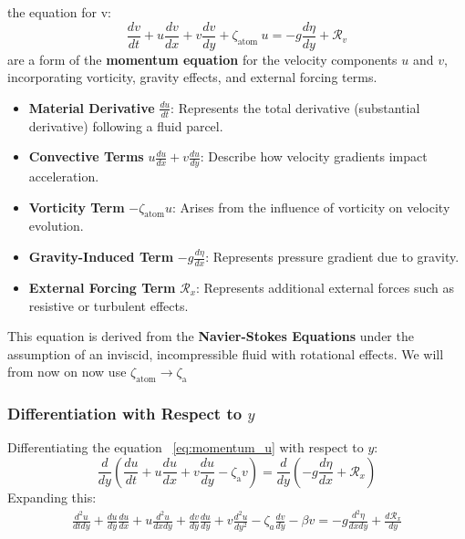 \documentclass[a4paper,12pt]{article}
\begin{document}
    the equation for v:
    \begin{equation}
        \frac{d v}{d t}+u \frac{d v}{d x}+v \frac{d v}{d y}+\zeta_{\text {atom }} u=-g \frac{d \eta}{d y}+\mathcal{R}_v\label{eq:momentum_v}
    \end{equation}
    are a form of the \textbf{momentum equation} for the velocity components $u$ and $v$, incorporating vorticity, gravity effects, and external
    forcing
    terms.

    \begin{itemize}
        \item \textbf{Material Derivative} $\frac{d u}{d t}$: Represents the total derivative (substantial derivative) following a fluid parcel.
        \item \textbf{Convective Terms} $u \frac{d u}{dx} + v \frac{d u}{dy}$: Describe how velocity gradients impact acceleration.
        \item \textbf{Vorticity Term} $-\zeta_\text{atom} u$: Arises from the influence of vorticity on velocity evolution.
        \item \textbf{Gravity-Induced Term} $-g \frac{d \eta}{d x}$: Represents pressure gradient due to gravity.
        \item \textbf{External Forcing Term} $\mathcal{R}_x$: Represents additional external forces such as resistive or turbulent effects.
    \end{itemize}

    This equation is derived from the \textbf{Navier-Stokes Equations} under the assumption of an inviscid, incompressible fluid with rotational
    effects.
    We will from now on now use $\zeta_\text{atom} \rightarrow \zeta_\text{a} $

    \subsubsection*{Differentiation with Respect to $y$}
    Differentiating the equation ~\ref{eq:momentum_u} with respect to $y$:
    \begin{equation*}
        \frac{d}{dy} \left( \frac{d u}{d t} + u \frac{d u}{d x} + v \frac{d u}{d y} - \zeta_\text{a} v \right) = \frac{d}{dy} \left( - g
                                                                                                                                   \frac{d \eta}{d x} + \mathcal{R}_x \right)
    \end{equation*}
    Expanding this:
    \begin{align}
        \frac{d^2 u}{d t d y}+\frac{d u}{d y} \frac{d u}{d x}+u \frac{d^2 u}{d x d y}+\frac{d v}{d y} \frac{d u}{d y}+v \frac{d^2 u}{d y^2}-\zeta_a \frac{d v}{d y}-\beta v=-g \frac{d^2 \eta}{d x d y}+\frac{d \mathcal{R}_x}{d y}
    \end{align}
\end{document}
